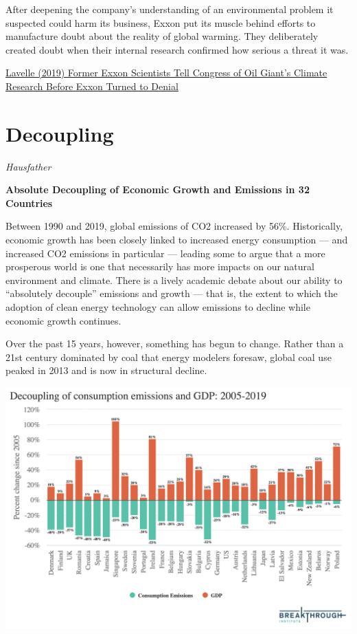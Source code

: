 \documentclass[
]{book}
\begin{document}
After deepening the company's understanding of an environmental problem it suspected could harm its business, Exxon put its muscle behind efforts to manufacture doubt about the reality of global warming.
They deliberately created doubt when their internal research confirmed how serious a threat it was.

\href{https://insideclimatenews.org/news/24102019/exxon-scientists-climate-research-testify-congess-denial/}{Lavelle (2019) Former Exxon Scientists Tell Congress of Oil Giant's Climate Research Before Exxon Turned to Denial}

\hypertarget{decoupling}{%
\chapter{Decoupling}\label{decoupling}}

\emph{Hausfather}

\textbf{Absolute Decoupling of Economic Growth and Emissions in 32 Countries}

Between 1990 and 2019, global emissions of CO2 increased by 56\%. Historically, economic growth has been closely linked to increased energy consumption --- and increased CO2 emissions in particular --- leading some to argue that a more prosperous world is one that necessarily has more impacts on our natural environment and climate. There is a lively academic debate about our ability to ``absolutely decouple'' emissions and growth --- that is, the extent to which the adoption of clean energy technology can allow emissions to decline while economic growth continues.

Over the past 15 years, however, something has begun to change. Rather than a 21st century dominated by coal that energy modelers foresaw, global coal use peaked in 2013 and is now in structural decline.

\includegraphics{fig/hausfather_decoupling.png}
\end{document}
